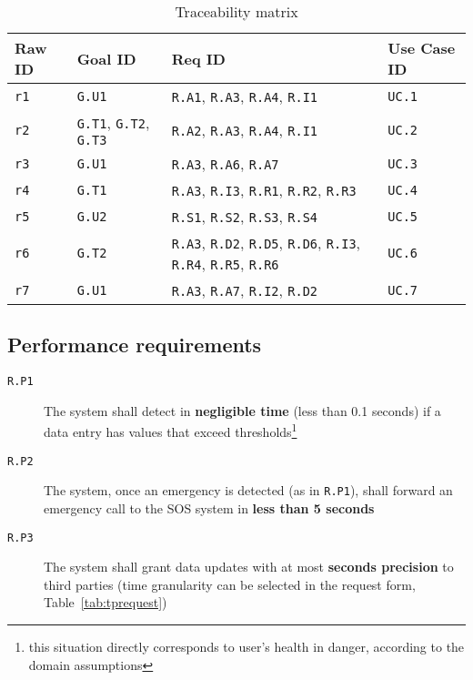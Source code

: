     \begin{table}[h!]
      \centering
      \begin{tabularx}{.8\linewidth}{|X|X|X|X|}
        \hline
        \textbf{Raw ID} & \textbf{Goal ID} & \textbf{Req ID} & \textbf{Use Case ID} \\ \hline
        \texttt{r1} & \texttt{G.U1} & \texttt{R.A1}, \texttt{R.A3}, \texttt{R.A4}, \texttt{R.I1} & \texttt{UC.1} \\
        \hline
        \texttt{r2} & \texttt{G.T1}, \texttt{G.T2}, \texttt{G.T3} & \texttt{R.A2}, \texttt{R.A3}, \texttt{R.A4}, \texttt{R.I1} & \texttt{UC.2} \\
        \hline
        \texttt{r3} & \texttt{G.U1} & \texttt{R.A3}, \texttt{R.A6}, \texttt{R.A7} & \texttt{UC.3} \\
        \hline
        \texttt{r4} & \texttt{G.T1} & \texttt{R.A3}, \texttt{R.I3}, \texttt{R.R1}, \texttt{R.R2}, \texttt{R.R3}& \texttt{UC.4}  \\
        \hline
        \texttt{r5} & \texttt{G.U2} & \texttt{R.S1},  \texttt{R.S2}, \texttt{R.S3}, \texttt{R.S4} & \texttt{UC.5} \\
        \hline
        \texttt{r6} & \texttt{G.T2} & \texttt{R.A3},  \texttt{R.D2}, \texttt{R.D5}, \texttt{R.D6}, \texttt{R.I3}, \texttt{R.R4}, \texttt{R.R5}, \texttt{R.R6} & \texttt{UC.6}   \\
        \hline
        \texttt{r7} & \texttt{G.U1} & \texttt{R.A3}, \texttt{R.A7},  \texttt{R.I2},  \texttt{R.D2} & \texttt{UC.7}   \\
        \hline
      \end{tabularx}
      \caption{Traceability matrix}
      \label{tab:tracmatrix}
    \end{table}

  \clearpage
  \subsection{Performance requirements}
  \label{sec:performance}

    \begin{description}
      \item[\texttt{R.P1}] The system shall detect in \textbf{negligible time} (less than 0.1 seconds) if a data entry has values that exceed thresholds\footnote{this situation directly corresponds to user's health in danger, according to the domain assumptions}
      \item[\texttt{R.P2}] The system, once an emergency is detected (as in \texttt{R.P1}), shall forward an emergency call to the SOS system in \textbf{less than 5 seconds}
      \item[\texttt{R.P3}] The system shall grant data updates with at most \textbf{seconds precision} to third parties (time granularity can be selected in the request form, Table~\ref{tab:tprequest})
    \end{description}

